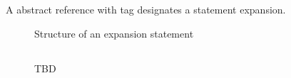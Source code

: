 \subsection{}
\label{sec:ifc:StmtSort:Expansion}

A  abstract reference with tag 
designates a statement expansion.

\begin{figure}[H]
	\centering
	\caption{Structure of an expansion statement}
	\label{fig:ifc-expansion-stmt-structure}
\end{figure}


\subsection{}
\label{sec:ifc:StmtSort:SyntaxTree}

\begin{figure}[H]
	\centering
	TBD
\end{figure}



